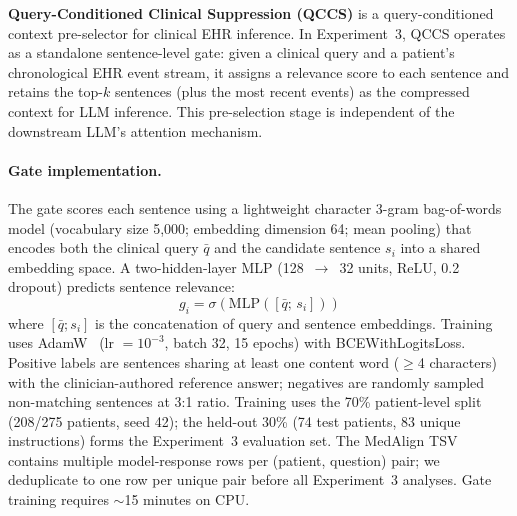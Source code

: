 \documentclass{article}
\begin{document}
\textbf{Query-Conditioned Clinical Suppression (QCCS)} is a query-conditioned
context pre-selector for clinical EHR inference. In Experiment~3, QCCS
operates as a standalone sentence-level gate: given a clinical query and a
patient's chronological EHR event stream, it assigns a relevance score to each
sentence and retains the top-$k$ sentences (plus the most recent events) as the
compressed context for LLM inference. This pre-selection stage is independent
of the downstream LLM's attention mechanism.

\paragraph{Gate implementation.} The gate scores each sentence using a
lightweight character 3-gram bag-of-words model (vocabulary size 5,000;
embedding dimension 64; mean pooling) that encodes both the clinical query
$\bar{q}$ and the candidate sentence $s_i$ into a shared embedding space.
A two-hidden-layer MLP (128~$\to$~32 units, ReLU, 0.2 dropout) predicts
sentence relevance:
\begin{equation}
  g_i = \sigma\!\left(\mathrm{MLP}\!\left([\bar{q};\, s_i]\right)\right)
  \label{eq:gate}
\end{equation}
where $[\bar{q}; s_i]$ is the concatenation of query and sentence embeddings.
Training uses AdamW~\cite{loshchilov2019adamw} (lr $= 10^{-3}$, batch 32,
15 epochs) with BCEWithLogitsLoss. Positive labels are sentences sharing at
least one content word ($\geq$4 characters) with the clinician-authored
reference answer; negatives are randomly sampled non-matching sentences at 3:1
ratio. Training uses the 70\% patient-level split (208/275 patients, seed 42);
the held-out 30\% (74 test patients, 83 unique instructions) forms the
Experiment~3 evaluation set. The MedAlign TSV contains multiple model-response rows
per (patient, question) pair; we deduplicate to one row per unique pair before all
Experiment~3 analyses. Gate training requires $\sim$15 minutes on CPU.
\end{document}
